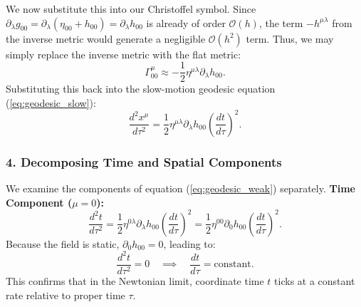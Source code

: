 \documentclass[11pt, a4paper]{report}
\begin{document}
We now substitute this into our Christoffel symbol. Since $\partial_{\lambda}g_{00} = \partial_{\lambda}(\eta_{00} + h_{00}) = \partial_{\lambda}h_{00}$ is already of order $\mathcal{O}(h)$, the term $-h^{\mu\lambda}$ from the inverse metric would generate a negligible $\mathcal{O}(h^{2})$ term. Thus, we may simply replace the inverse metric with the flat metric:
\begin{equation}
\Gamma^{\mu}_{00} \approx -\frac{1}{2}\eta^{\mu\lambda}\partial_{\lambda}h_{00}.
\end{equation}
Substituting this back into the slow-motion geodesic equation (\ref{eq:geodesic_slow}):
\begin{equation}
\label{eq:geodesic_weak}
\frac{d^{2}x^{\mu}}{d\tau^{2}} = \frac{1}{2}\eta^{\mu\lambda}\partial_{\lambda}h_{00}\left(\frac{dt}{d\tau}\right)^{2}.
\end{equation}

\subsubsection*{4. Decomposing Time and Spatial Components}
We examine the components of equation (\ref{eq:geodesic_weak}) separately. 
\textbf{Time Component ($\mu = 0$):}
\begin{equation}
\frac{d^{2}t}{d\tau^{2}} = \frac{1}{2}\eta^{0\lambda}\partial_{\lambda}h_{00}\left(\frac{dt}{d\tau}\right)^{2} = \frac{1}{2}\eta^{00}\partial_{0}h_{00}\left(\frac{dt}{d\tau}\right)^{2}.
\end{equation}
Because the field is static, $\partial_{0}h_{00} = 0$, leading to:
\begin{equation}
\frac{d^{2}t}{d\tau^{2}} = 0 \quad \implies \quad \frac{dt}{d\tau} = \text{constant}.
\end{equation}
This confirms that in the Newtonian limit, coordinate time $t$ ticks at a constant rate relative to proper time $\tau$.
\end{document}
